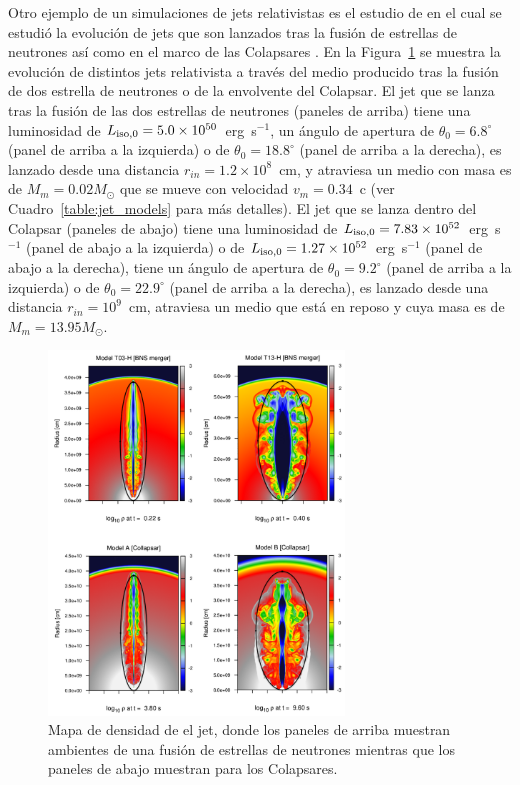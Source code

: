 \documentclass[12pt,a4paper]{book}
\begin{document}
Otro ejemplo de un simulaciones de jets relativistas es el estudio de \cite{JBEMGRB} en el cual se estudió la evolución de jets que son lanzados tras la fusión de estrellas de neutrones así como en el 
marco de las Colapsares \cite{JBEMGRB}. 
En la Figura~\ref{fig:jet_models} se muestra la evolución de distintos jets relativista a través del medio producido tras la fusión de dos estrella de neutrones o de la envolvente del Colapsar. {\color{blue} El jet que se 
lanza tras la fusión de las dos estrellas de neutrones (paneles de arriba) tiene una luminosidad de $L_{\rm iso, 0} = 5.0 \times10^{50}$~erg~s$^{-1}$, un ángulo de apertura de $\theta_0=6.8^{\circ}$ (panel de arriba a la 
izquierda) o de $\theta_0=18.8^{\circ}$ (panel de arriba a la derecha), es lanzado desde una distancia $r_{in}=1.2\times10^{8}$~cm, y atraviesa un medio con masa es de $M_{m} = 0.02 M_{\odot}$ que se mueve con 
velocidad $v_{m} = 0.34$~c (ver Cuadro~\ref{table:jet_models} 
para más detalles). El jet que se lanza dentro del Colapsar (paneles de abajo) tiene una luminosidad de $L_{\rm iso, 0} = 7.83 \times10^{52}$~erg~s$^{-1}$ (panel de abajo a la izquierda) o 
de $L_{\rm iso, 0} = 1.27 \times10^{52}$~erg~s$^{-1}$ (panel de abajo a la derecha), tiene un ángulo de apertura de $\theta_0=9.2^{\circ}$ (panel de arriba a la izquierda) o de $\theta_0=22.9^{\circ}$ (panel de arriba a la derecha), 
es lanzado desde una distancia $r_{in}=10^{9}$~cm, atraviesa un medio que está en reposo y cuya masa es de $M_{m} = 13.95 M_{\odot}$.}
\begin{figure} 
  \centering
    \includegraphics[width=0.7\textwidth]{Figuras/Introduccion/jet_models.png}
  \caption{Mapa de densidad de el jet, donde los paneles de arriba muestran ambientes de una fusión de estrellas de neutrones mientras que los paneles de abajo muestran para los Colapsares.}
  \label{fig:jet_models}
\end{figure}
\end{document}
